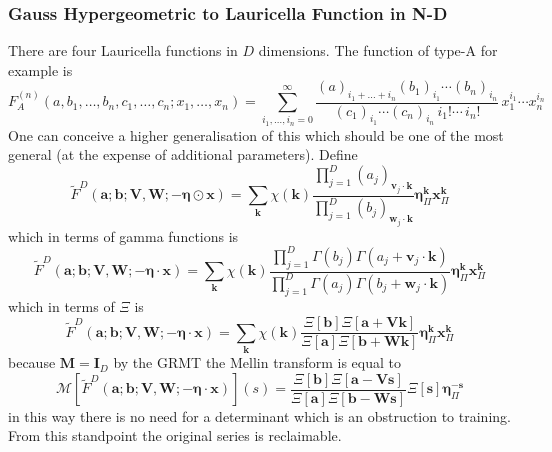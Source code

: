 \documentclass{article}
\begin{document}
\subsubsection{Gauss Hypergeometric to Lauricella Function in N-D}
There are four Lauricella functions in $D$ dimensions. The function of type-A for example is
\begin{equation}
F_A^{(n)}(a, b_1,\ldots,b_n, c_1,\ldots,c_n; x_1,\ldots,x_n) = 
\sum_{i_1,\ldots,i_n=0}^{\infty} \frac{(a)_{i_1+\ldots+i_n} (b_1)_{i_1} \cdots (b_n)_{i_n}} {(c_1)_{i_1} \cdots (c_n)_{i_n} \,i_1! \cdots \,i_n!} \,x_1^{i_1} \cdots x_n^{i_n}
\end{equation}
One can conceive a higher generalisation of this which should be one of the most general (at the expense of additional parameters). Define
\begin{equation}
\tilde{F}^{D}(\mathbf{a};\mathbf{b};\mathbf{V,W};-\boldsymbol\eta \odot\mathbf{x}) = \sum_{\mathbf{k}} \chi(\mathbf{k})\frac{\prod_{j=1}^D (a_j)_{\mathbf{v}_j \cdot \mathbf{k}}}{\prod_{j=1}^D (b_j)_{\mathbf{w}_j \cdot \mathbf{k}}} \boldsymbol\eta^{\mathbf{k}}_\Pi\mathbf{x}^{\mathbf{k}}_\Pi
\end{equation}
which in terms of gamma functions is 
\begin{equation}
\tilde{F}^{D}(\mathbf{a};\mathbf{b};\mathbf{V,W};-\boldsymbol\eta \cdot\mathbf{x}) = \sum_{\mathbf{k}} \chi(\mathbf{k})\frac{\prod_{j=1}^D \Gamma(b_j)\Gamma(a_j + \mathbf{v}_j\cdot \mathbf{k})}{\prod_{j=1}^D \Gamma(a_j)\Gamma(b_j+\mathbf{w}_j\cdot \mathbf{k})} \boldsymbol\eta_\Pi^\mathbf{k}\mathbf{x}_\Pi^\mathbf{k}
\end{equation}
which in terms of $\Xi$ is
\begin{equation}
\tilde{F}^{D}(\mathbf{a};\mathbf{b};\mathbf{V,W};-\boldsymbol\eta \cdot\mathbf{x}) = \sum_{\mathbf{k}} \chi(\mathbf{k})\frac{\Xi[\mathbf{b}]\Xi[\mathbf{a}+\mathbf{Vk}]}{\Xi[\mathbf{a}]\Xi[\mathbf{b+Wk}]} \boldsymbol\eta_\Pi^\mathbf{k}\mathbf{x}_\Pi^\mathbf{k}
\end{equation}
because $\mathbf{M}=\mathbf{I}_D$ by the GRMT the Mellin transform is equal to \begin{equation}
\mathcal{M}[\tilde{F}^{D}(\mathbf{a};\mathbf{b};\mathbf{V,W};-\boldsymbol\eta \cdot\mathbf{x})](s) = \frac{\Xi[\mathbf{b}]\Xi[\mathbf{a}-\mathbf{Vs}]}{\Xi[\mathbf{a}]\Xi[\mathbf{b-Ws}]}\Xi[\mathbf{s}]\boldsymbol\eta_\Pi^{-\mathbf{s}}
\end{equation}
in this way there is no need for a determinant which is an obstruction to training. From this standpoint the original series is reclaimable.
\end{document}
